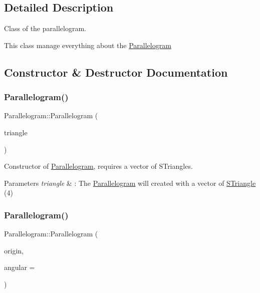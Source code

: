\subsection{Detailed Description}
Class of the parallelogram. 

This class manage everything about the \hyperlink{classParallelogram}{Parallelogram} 

\subsection{Constructor \& Destructor Documentation}
\mbox{\label{classParallelogram_ac028ca113b67af9295c474a93bc13b86}} 
\subsubsection{\texorpdfstring{Parallelogram()}{Parallelogram()}\hspace{0.1cm}{\footnotesize\ttfamily [1/2]}}
{\footnotesize\ttfamily Parallelogram\+::\+Parallelogram (\begin{DoxyParamCaption}\item[{const std\+::vector$<$ \hyperlink{classSTriangle}{S\+Triangle} $>$ \&}]{triangle }\end{DoxyParamCaption})\hspace{0.3cm}{\ttfamily [explicit]}}



Constructor of \hyperlink{classParallelogram}{Parallelogram}, requires a vector of S\+Triangles. 


\begin{DoxyParams}{Parameters}
{\em triangle} & \+: The \hyperlink{classParallelogram}{Parallelogram} will created with a vector of \hyperlink{classSTriangle}{S\+Triangle} (4) \\
\hline
\end{DoxyParams}
\mbox{\label{classParallelogram_afe4d20e613d01f409788d1875afcd8a8}} 
\subsubsection{\texorpdfstring{Parallelogram()}{Parallelogram()}\hspace{0.1cm}{\footnotesize\ttfamily [2/2]}}
{\footnotesize\ttfamily Parallelogram\+::\+Parallelogram (\begin{DoxyParamCaption}\item[{\hyperlink{classPoint}{Point}$<$ double $>$}]{origin,  }\item[{double}]{angular = {} }\end{DoxyParamCaption})\hspace{0.3cm}{\ttfamily [explicit]}}



